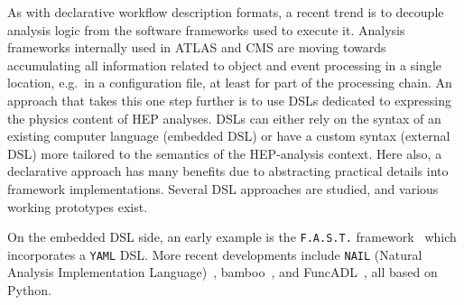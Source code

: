 \documentclass[11pt]{article}
\begin{document}
As with declarative workflow description formats, a recent trend is to decouple analysis logic from the software frameworks used to execute it. Analysis frameworks internally used in \gls{ATLAS} and \gls{CMS}
are moving towards accumulating all information related to object and event processing in a single location, e.g.~in a configuration file, at least for part of the processing chain. An approach that takes this one step further is to use \glspl{DSL} dedicated to expressing the physics content of \gls{HEP} analyses. \glspl{DSL} can either rely on the syntax of an existing computer language (embedded \gls{DSL}) or have a custom syntax (external \gls{DSL}) more tailored to the semantics of the \gls{HEP}-analysis context. Here also, a declarative approach has many benefits due to abstracting practical details into framework implementations. Several \gls{DSL} approaches are studied, and various working prototypes exist.



On the embedded \gls{DSL} side, an early example is the \texttt{F.A.S.T.} framework~\cite{FAST} which incorporates a \texttt{YAML} \gls{DSL}. More recent developments include  
\texttt{NAIL} (Natural Analysis Implementation Language)~\cite{NAIL}, bamboo~\cite{David:2021ohq}, and FuncADL~\cite{Proffitt:2021wfh}, all based on  Python. 
\end{document}
